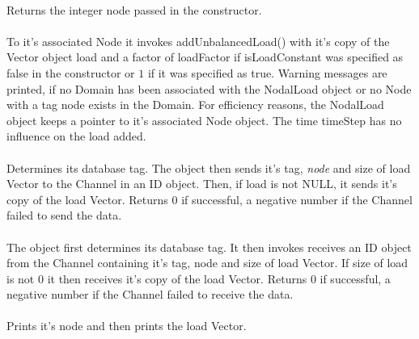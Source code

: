  \\
Returns the integer \p node passed in the constructor. \\

 \\
To it's associated Node it invokes addUnbalancedLoad() with it's
copy of the Vector object \p load and a factor of \p loadFactor
if \p isLoadConstant was specified as \p false in the constructor or
$1$ if it was specified as \p true. Warning
messages are printed, if no Domain has been associated with the
NodalLoad object or no Node with a tag \p node exists in the
Domain. For efficiency reasons, the NodalLoad object keeps a pointer
to it's associated Node object. The time \p timeStep has no
influence on the load added. \\

 \\
Determines its database tag. The object then sends it's tag, {\em
node} and size of load Vector to the Channel in an ID object. Then, if
\p load is not NULL, it sends it's copy of the \p load
Vector. Returns $0$ if successful, a negative number if the Channel
failed to send the data. \\  

 \\
The object first determines its database tag. It then invokes receives
an ID object from the Channel containing it's tag, \p node and size
of load Vector. If size of \p load is not $0$ it then receives it's
copy of the \p load Vector. Returns $0$ if successful, a negative 
number if the Channel failed to receive the data. \\ 

 \\
Prints it's \p node and then prints the load Vector. \\

